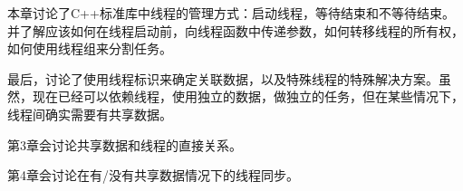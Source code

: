 
本章讨论了C++标准库中线程的管理方式：启动线程，等待结束和不等待结束。并了解应该如何在线程启动前，向线程函数中传递参数，如何转移线程的所有权，如何使用线程组来分割任务。

最后，讨论了使用线程标识来确定关联数据，以及特殊线程的特殊解决方案。虽然，现在已经可以依赖线程，使用独立的数据，做独立的任务，但在某些情况下，线程间确实需要有共享数据。

第3章会讨论共享数据和线程的直接关系。

第4章会讨论在有/没有共享数据情况下的线程同步。